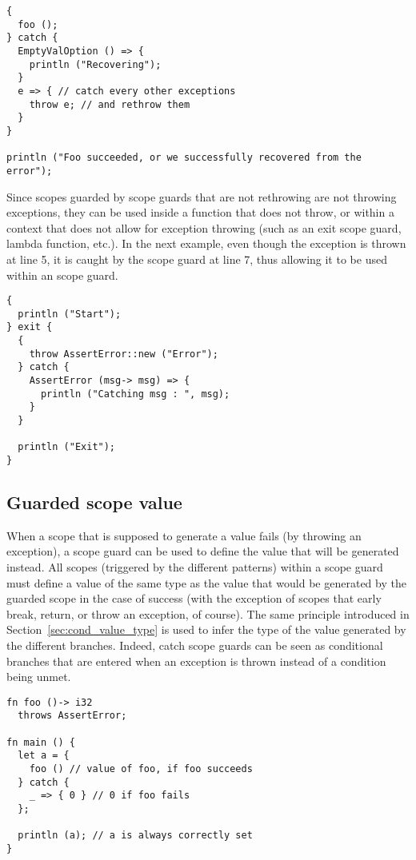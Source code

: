 \begin{lstlisting}[style=coloredverbatim]
{
  foo ();
} catch {
  EmptyValOption () => {
    println ("Recovering");
  }
  e => { // catch every other exceptions
    throw e; // and rethrow them
  }
}

println ("Foo succeeded, or we successfully recovered from the error");
\end{lstlisting}

Since scopes guarded by  scope guards that are not rethrowing are
not throwing exceptions, they can be used inside a function that does not throw,
or within a context that does not allow for exception throwing (such as an exit
scope guard, lambda function, etc.). In the next example, even though the
exception  is thrown at line 5, it is caught by the scope
guard at line 7, thus allowing it to be used within an  scope guard.

\begin{lstlisting}[style=coloredverbatim]
{
  println ("Start");
} exit {
  {
    throw AssertError::new ("Error");
  } catch {
    AssertError (msg-> msg) => {
      println ("Catching msg : ", msg);
    }
  }

  println ("Exit");
}
\end{lstlisting}

\subsection{Guarded scope value}

When a scope that is supposed to generate a value fails (by throwing an
exception), a  scope guard can be used to define the value that
will be generated instead. All scopes (triggered by the different patterns)
within a  scope guard must define a value of the same type as the
value that would be generated by the guarded scope in the case of success (with
the exception of scopes that early break, return, or throw an exception, of
course). The same principle introduced in Section~\ref{sec:cond_value_type} is
used to infer the type of the value generated by the different branches. Indeed,
catch scope guards can be seen as  conditional branches that are
entered when an exception is thrown instead of a condition being unmet.

\begin{lstlisting}[style=coloredverbatim]
fn foo ()-> i32
  throws AssertError;

fn main () {
  let a = {
    foo () // value of foo, if foo succeeds
  } catch {
    _ => { 0 } // 0 if foo fails
  };

  println (a); // a is always correctly set
}
\end{lstlisting}


